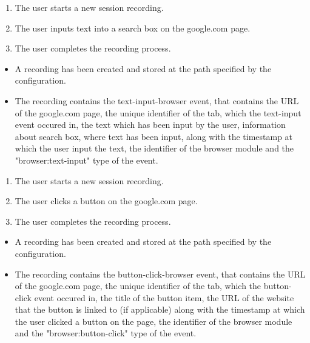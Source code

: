 \begin{tests}
	{\begin{enumerate}
		\item The \gls{user} starts a new \gls{session} recording.
		\item The \gls{user} inputs text into a search box on the google.com page.
		\item The \gls{user} completes the recording process.
	\end{enumerate}}
	{\begin{itemize}
		\item A recording has been created and stored at the path specified by the configuration.
		\item The recording contains the text-input-browser \gls{event},  that contains the URL of the google.com page, the unique identifier of the tab, which the text-input \gls{event} occured in, the text which has been input by the \gls{user}, information about search box, where text has been input, along with the timestamp at which the \gls{user} input the text, the identifier of the \gls{browser} module and the "browser:text-input" type of the event.
	\end{itemize}}
	
\newpage
	{\begin{enumerate}
		\item The \gls{user} starts a new \gls{session} recording.
		\item The \gls{user} clicks a button on the google.com page.
		\item The \gls{user} completes the recording process.
	\end{enumerate}}
	{\begin{itemize}
		\item A recording has been created and stored at the path specified by the configuration.
		\item The recording contains the button-click-browser \gls{event},  that contains the URL of the google.com page, the unique identifier of the tab, which the button-click \gls{event} occured in, the title of the button item, the URL of the website that the button is linked to (if applicable) along with the timestamp at which the \gls{user} clicked a button on the page, the identifier of the \gls{browser} module and the "browser:button-click" type of the event.
	\end{itemize}}
	

\end{tests}
